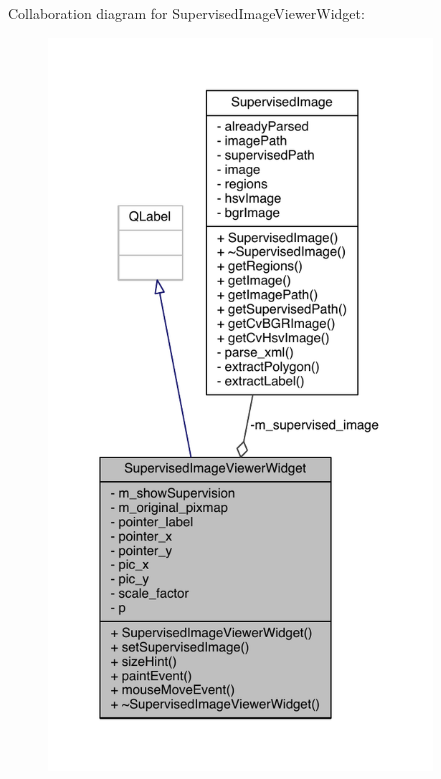 Collaboration diagram for Supervised\+Image\+Viewer\+Widget\+:
\nopagebreak
\begin{figure}[H]
\begin{center}
\leavevmode
\includegraphics[height=550pt]{class_supervised_image_viewer_widget__coll__graph}
\end{center}
\end{figure}


